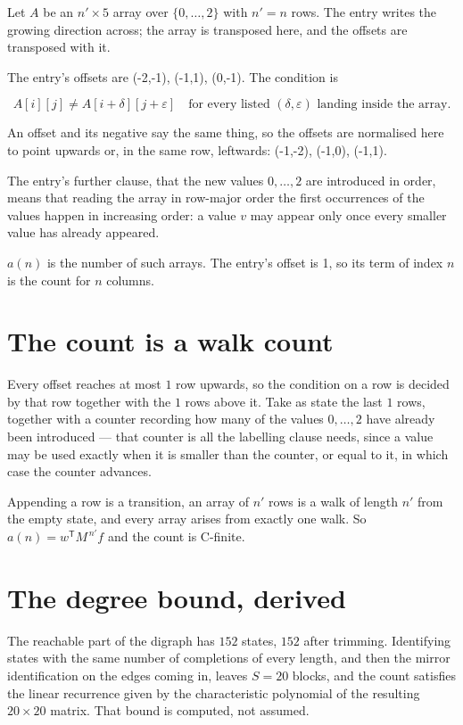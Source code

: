 \documentclass[11pt]{article}
\theoremstyle{definition}
\begin{document}
Let $A$ be an $n' \times 5$ array over $\{0,\dots,2\}$ with $n' = n$ rows. The entry writes the growing direction across; the array is transposed here, and the offsets are transposed with it.

The entry's offsets are (-2,-1), (-1,1), (0,-1). The condition is

\[A[i][j] \ne A[i{+}\delta][j{+}\varepsilon]\quad\text{for every listed }(\delta,\varepsilon)\text{ landing inside the array.}\]

An offset and its negative say the same thing, so the offsets are normalised here to point upwards or, in the same row, leftwards: (-1,-2), (-1,0), (-1,1).

The entry's further clause, that the new values $0,\dots,2$ are introduced in order, means that reading the array in row-major order the first occurrences of the values happen in increasing order: a value $v$ may appear only once every smaller value has already appeared.

$a(n)$ is the number of such arrays. The entry's offset is 1, so its term of index $n$ is the count for $n$ columns.

\section{The count is a walk count}

Every offset reaches at most $1$ row upwards, so the condition on a row is decided by that row together with the $1$ rows above it. Take as state the last $1$ rows, together with a counter recording how many of the values $0,\dots,2$ have already been introduced --- that counter is all the labelling clause needs, since a value may be used exactly when it is smaller than the counter, or equal to it, in which case the counter advances.

Appending a row is a transition, an array of $n'$ rows is a walk of length $n'$ from the empty state, and every array arises from exactly one walk. So $a(n) = w^{\mathsf T}M^{\,n'}f$ and the count is C-finite.

\section{The degree bound, derived}

The reachable part of the digraph has $152$ states, $152$ after trimming. Identifying states with the same number of completions of every length, and then the mirror identification on the edges coming in, leaves $S = 20$ blocks, and the count satisfies the linear recurrence given by the characteristic polynomial of the resulting $20\times20$ matrix. That bound is computed, not assumed.
\end{document}
